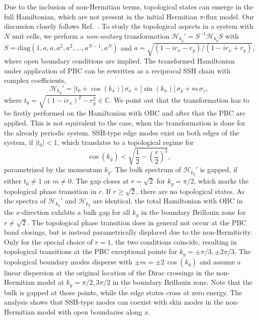 Due to the inclusion of non-Hermitian terms, topological states can emerge in the full Hamiltonian, which are not present in the initial Hermitian $\pi$-flux model. Our discussion closely follows Ref.~\cite{Shunyu2018prl}. To study the topological aspects in a system with $N$ unit cells, we perform a \textit{non-unitary} transformation $\mathcal{H}_{k_y}' = S^{-1} \mathcal{H}_{k_y}S$ with $S= \text{diag}(1, a,a,a^2,a^2, \dots,a^{N-1}, a^N)$ and $a= \sqrt{(1-i r_x -r_y)/(1-i r_x +r_y)}$, where open boundary conditions are implied. The transformed Hamiltonian under application of PBC can be rewritten as a reciprocal SSH chain with complex coefficients,
\begin{equation}
\mathcal{H}_{k_y}' =  \big[t_0+\cos(k_x) \big]\,\sigma_x + \big[\sin(k_x) \big]\,\sigma_y + m \, \sigma_z,
\end{equation}
where $t_0 = \sqrt{(1-i r_x)^2-r_y^2} \in \mathbb{C}$. We point out that the transformation has to be firstly performed on the Hamiltonian with OBC and after that the PBC are applied. This is not equivalent to the case, when the transformation is done for the already periodic system. SSH-type edge modes exist on both edges of the system, if $|t_0|<1$, which translates to a topological regime for
\begin{equation}
\cos(k_y) < \sqrt{\frac{1}{2} - \left(\frac{r}{2}\right)^2},
\end{equation}
parametrized by the momentum $k_y$. The bulk spectrum of $\mathcal{H}_{k_y}'$ is gapped, if either $t_0 \neq 1$ or $m\neq 0$. The gap closes at $r=\sqrt{2}$ for $k_y = \pi/2$, which marks the topological phase transition in $r$. If $r\geq\sqrt{2}$, there are no topological states. As the spectra of $\mathcal{H}_{k_y}'$ and $\mathcal{H}_{k_y}$ are identical, the total Hamiltonian with OBC in the $x$-direction exhibits a bulk gap for all $k_y$ in the boundary Brillouin zone for $r\neq \sqrt{2}$. The topological phase transition does in general not occur at the PBC band closings, but is instead parametrically displaced due to the non-Hermiticity. Only for the special choice of $r=1$, the two conditions coincide, resulting in topological transitions at the PBC exceptional points for $k_y = \pm \pi/3, \pm 2 \pi /3$. The topological boundary modes disperse with $\pm m = \pm 2 \, \cos(k_y)$ and assume a linear dispersion at the original location of the Dirac crossings in the non-Hermitian model at $k_y = \pi/2, 3\pi/2$ in the boundary Brillouin zone. Note that the bulk is gapped at those points, while the edge states cross at zero energy. The analysis shows that SSH-type modes can coexist with skin modes in the non-Hermitian model with open boundaries along $x$.


